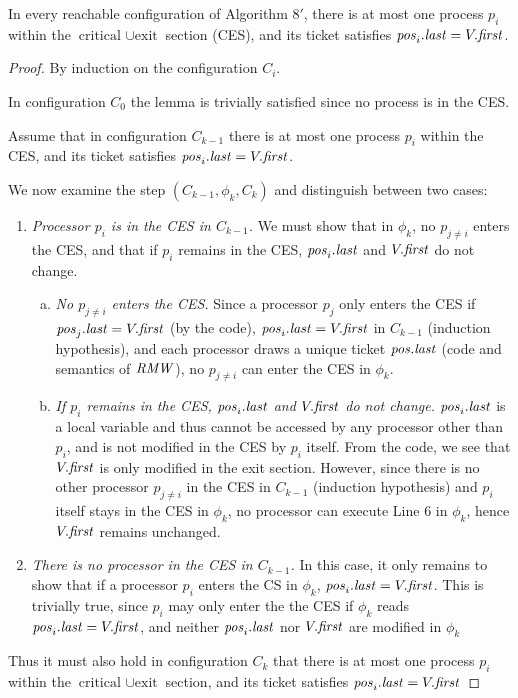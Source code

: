 \begin{lemma} \label{lemma:3.mutual_exclusion}
In every reachable configuration of Algorithm $8'$, there is at most one process
$p_i$ within the $\text{critical } \cup \text{exit}$ section (CES), and its ticket
satisfies $\mathit{pos}_i.\mathit{last} = V.\mathit{first}$.
\end{lemma}

\begin{proof}
By induction on the configuration $C_i$.

In configuration $C_0$ the lemma is trivially satisfied since no process is in
the CES.

Assume that in configuration $C_{k-1}$ there is at most one process
$p_i$ within the CES, and its ticket
satisfies $\mathit{pos}_i.\mathit{last} = V.\mathit{first}$.

We now examine the step $(C_{k-1}, \phi_k, C_k)$ and distinguish between two cases: 
\begin{enumerate}
\item \emph{Processor $p_i$ is in the CES in $C_{k-1}$.} We must show that in $\phi_k$,
      no $p_{j \neq i}$ enters the CES, and that if $p_i$
      remains in the CES, $\mathit{pos}_i.\mathit{last}$ and $V.\mathit{first}$ do not change.
      \begin{enumerate}[a)]
      \item \emph{No $p_{j \neq i}$ enters the CES.} 
            Since a processor $p_j$ only enters the CES
            if $\mathit{pos}_j.\mathit{last} = V.\mathit{first}$ (by the code),
            $\mathit{pos}_i.\mathit{last} = V.\mathit{first}$ in $C_{k-1}$ (induction hypothesis),
            and each processor draws a unique ticket $\mathit{pos}.\mathit{last}$ (code and
            semantics of $\mathit{RMW}$), no $p_{j \neq i}$ can enter the CES in $\phi_k$.
      \item \emph{If $p_i$ remains in the CES, $\mathit{pos}_i.\mathit{last}$ and $V.\mathit{first}$ 
            do not change.} $\mathit{pos}_i.\mathit{last}$ is a local variable and thus cannot
            be accessed by any processor other than $p_i$, and is not modified 
            in the CES by $p_i$ itself. From the code, we see that $V.\mathit{first}$
            is only modified in the exit section. However, since there is no
            other processor $p_{j \neq i}$ in the CES in $C_{k-1}$
            (induction hypothesis) and $p_i$ itself stays in the CES in $\phi_k$,
            no processor can execute Line 6 in $\phi_k$, hence $V.\mathit{first}$
            remains unchanged.            
      \end{enumerate}
\item \emph{There is no processor in the CES in $C_{k-1}$.}
      In this case, it only remains to show that if a processor $p_i$ enters
      the CS in $\phi_k$, $\mathit{pos}_i.\mathit{last} = V.\mathit{first}$. This is trivially true,
      since $p_i$ may only enter the the CES if $\phi_k$ reads
      $\mathit{pos}_i.\mathit{last} = V.\mathit{first}$, and neither $\mathit{pos}_i.\mathit{last}$ nor $V.\mathit{first}$
      are modified in $\phi_k$
\end{enumerate}
Thus it must also hold in configuration $C_k$ that there is at most one process
$p_i$ within the $\text{critical } \cup \text{exit}$ section, and its ticket
satisfies $\mathit{pos}_i.\mathit{last} = V.\mathit{first}$
\end{proof}



